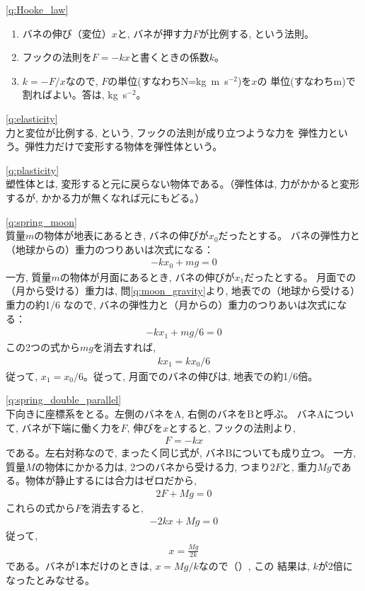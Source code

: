 %
\ref{q:Hooke_law}
\begin{enumerate}
\item バネの伸び（変位）$x$と, バネが押す力$F$が比例する, という法則。
\item フックの法則を$F=-kx$と書くときの係数$k$。
\item $k=-F/x$なので, $F$の単位(すなわちN=kg~m~s$^{-2}$)を$x$の
単位(すなわちm)で割ればよい。答は, kg~s$^{-2}$。
\end{enumerate}
\vspace{0.2cm}

\ref{q:elasticity}\\
力と変位が比例する, という, フックの法則が成り立つような力を
弾性力という。弾性力だけで変形する物体を弾性体という。
\vspace{0.2cm}

\ref{q:plasticity}\\
塑性体とは, 変形すると元に戻らない物体である。（弾性体は, 
力がかかると変形するが, かかる力が無くなれば元にもどる。）
\vspace{0.2cm}

\ref{q:spring_moon}\\
質量$m$の物体が地表にあるとき, バネの伸びが$x_0$だったとする。
バネの弾性力と（地球からの）重力のつりあいは次式になる：
\begin{eqnarray}-kx_0+mg=0\end{eqnarray}
一方, 質量$m$の物体が月面にあるとき, バネの伸びが$x_1$だったとする。
月面での（月から受ける）重力は, 問\ref{q:moon_gravity}より, 地表での（地球から受ける）重力の約1/6
なので, バネの弾性力と（月からの）重力のつりあいは次式になる：
\begin{eqnarray}-kx_1+mg/6=0\end{eqnarray}
この2つの式から$mg$を消去すれば, 
\begin{eqnarray}kx_1=kx_0/6\end{eqnarray}
従って, $x_1=x_0/6$。従って, 月面でのバネの伸びは, 地表での約1/6倍。
\vspace{0.2cm}

\ref{q:spring_double_parallel}\\
下向きに座標系をとる。左側のバネをA, 右側のバネをBと呼ぶ。
バネAについて, バネが下端に働く力を$F$, 伸びを$x$とすると, フックの法則より, 
\begin{eqnarray}F=-kx\end{eqnarray}
である。左右対称なので, まったく同じ式が, バネBについても成り立つ。
一方, 質量$M$の物体にかかる力は, 2つのバネから受ける力, つまり$2F$と, 
重力$Mg$である。物体が静止するには合力はゼロだから, 
\begin{eqnarray}2F+Mg=0\end{eqnarray}
これらの式から$F$を消去すると, 
\begin{eqnarray}-2kx+Mg=0\end{eqnarray}
従って, 
\begin{eqnarray}x=\frac{Mg}{2k}\end{eqnarray}
である。バネが1本だけのときは, $x=Mg/k$なので（）, この
結果は, $k$が2倍になったとみなせる。
\vspace{0.2cm}

